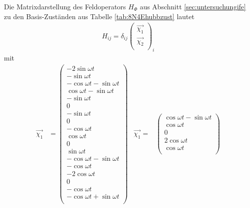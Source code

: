 Die Matrixdarstellung des Feldoperators $H_{\Phi}$ aus Abschnitt \ref{sec:untersuchungife} zu den Basis-Zuständen aus Tabelle \ref{tab:8N4Ehubbzust} lautet
\begin{align}
  H_{ij} = \delta_{ij}
  \begin{pmatrix}
    \vec{\mathcal{\chi}_1} \\
    \vec{\mathcal{\chi}_2} \\
  \end{pmatrix}_{i}
  \label{eqn:ifematrix}
\end{align}
mit
\begin{align*}
  \vec{\mathcal{\chi}_1} & =
  \begin{pmatrix}
    -2 \sin{\omega t} \\
    -\sin{\omega t} \\
    -\cos{\omega t}  -\sin{\omega t} \\
    \cos{\omega t}  -\sin{\omega t} \\
    -\sin{\omega t} \\
    0                                    \\
    -\sin{\omega t} \\
    0                                    \\
    -\cos{\omega t}                    \\
    \cos{\omega t}                    \\
    0                                    \\
    \sin{\omega t} \\
    -\cos{\omega t}  -\sin{\omega t} \\
    -\cos{\omega t}                    \\
    -2 \cos{\omega t}                    \\
    0                                    \\
    -\cos{\omega t}                    \\
    -\cos{\omega t}  +\sin{\omega t} \\
\end{pmatrix}
& \vec{\mathcal{\chi}_1} = &
\begin{pmatrix}
    \cos{\omega t}  -\sin{\omega t} \\
    \cos{\omega t}                    \\
    0                                    \\
    2 \cos{\omega t}                    \\
    \cos{\omega t}                    \\

\end{pmatrix}
\end{align*}
